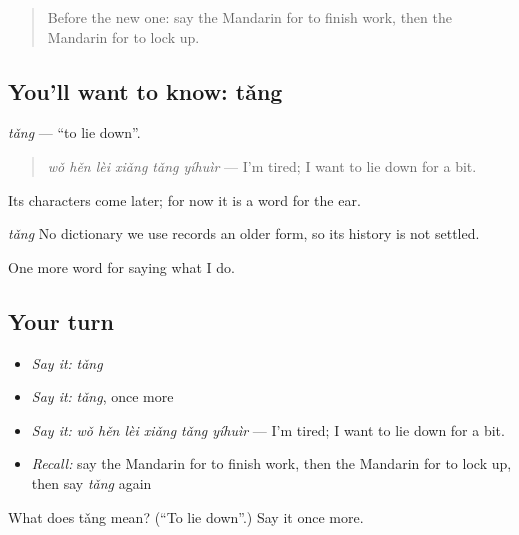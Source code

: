 \label{lesson:ZH-C183-tang}



\begin{quote}
Before the new one: say the Mandarin for to finish work, then the Mandarin for to lock up.
\end{quote}

\subsection*{You'll want to know: tǎng}
\emph{tǎng} — \textquotedblleft{}to lie down\textquotedblright{}.

\begin{quote}
\emph{wǒ hěn lèi xiǎng tǎng yíhuìr} — I'm tired; I want to lie down for a bit.
\end{quote}

Its characters come later; for now it is a word for the ear.

\begin{cousinweb}
\emph{tǎng} No dictionary we use records an older form, so its history is not settled.
\end{cousinweb}

\begin{grammarlens}[title={What you've built}]
One more word for saying what I do.
\end{grammarlens}

\subsection*{Your turn}
\begin{itemize}
\raggedright
  \item \emph{Say it:} \emph{tǎng}
  \item \emph{Say it:} \emph{tǎng}, once more
  \item \emph{Say it:} \emph{wǒ hěn lèi xiǎng tǎng yíhuìr} — I'm tired; I want to lie down for a bit.
  \item \emph{Recall:} say the Mandarin for to finish work, then the Mandarin for to lock up, then say \emph{tǎng} again
\end{itemize}

\begin{tcolorbox}[breakable,colback=teal!4,colframe=teal!35!black,title={Before you move on}]
What does tǎng mean? (\textquotedblleft{}To lie down\textquotedblright{}.) Say it once more.
\end{tcolorbox}
